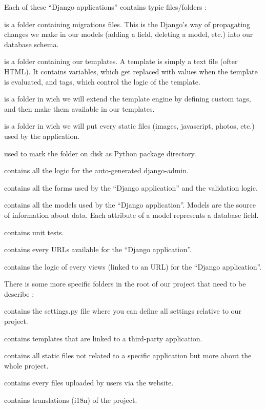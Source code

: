 \documentclass[11pt, a4paper]{article}   	%
\begin{document}
Each of these ``Django applications'' contains typic files/folders :
\begin{description}[noitemsep]
\item[- migrations/] is a folder containing migrations files. This is the Django’s way of propagating changes we make in our models (adding a field, deleting a model, etc.) into our database schema.
\item[- templates/] is a folder containing our templates. A template is simply a text file (ofter HTML). It contains variables, which get replaced with values when the template is evaluated, and tags, which control the logic of the template.
\item[- Templatestags/] is a folder in wich we will extend the template engine by defining custom tags, and then make them available in our templates.
\item[- static/] is a folder in wich we will put every static files (images, javascript, photos, etc.) used by the application.
\item[- \_\_init\_\_.py] used to mark the folder on disk as Python package directory.
\item[- admin.py] contains all the logic for the auto-generated django-admin.
\item[- forms.py] contains all the forms used by the ``Django application'' and the validation logic.
\item[- models.py] contains all the models used by the ``Django application''. Models are the source of information about data. Each attribute of a model represents a database field. 
\item[- tests.py] contains unit tests.
\item[- urls.py] contains every URLs available for the ``Django application''.
\item[- views.py] contains the logic of every views (linked to an URL) for the ``Django application''.
\end{description}

There is some more specific folders in the root of our project that need to be describe :
\begin{description}[noitemsep]
\item[- care4care/] contains the settings.py file where you can define all settings relative to our project.
\item[- templates/] contains templates that are linked to a third-party application.
\item[- static/] contains all static files not related to a specific application but more about the whole project.
\item[- media\_root/] contains every files uploaded by users via the website.
\item[- locale/] contains translations (i18n) of the project.
\end{description}
\end{document}
